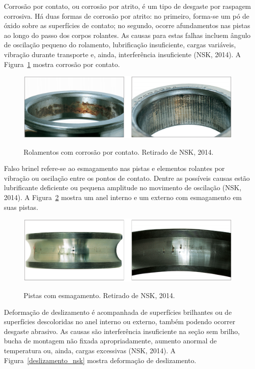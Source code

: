 \documentclass[
	12pt,				
	oneside,			
	a4paper,			
	english,			
	brazil,			
	]{abntex2ppgsi}
\begin{document}
Corrosão por contato, ou corrosão por atrito, é um tipo de desgaste por raspagem corrosiva. Há duas formas de corrosão por atrito: no primeiro, forma-se um pó de óxido sobre as superfícies de contato; no segundo, ocorre afundamentos nas pistas ao longo do passo dos corpos rolantes. As causas para estas falhas incluem ângulo de oscilação pequeno do rolamento, lubrificação insuficiente, cargas variáveis, vibração durante transporte e, ainda, interferência insuficiente (NSK, 2014). A Figura~\ref{corrosao_nsk} mostra corrosão por contato.

\begin{figure}[H]
\centering
\caption {Rolamentos com corrosão por contato. Retirado de NSK, 2014.}
\includegraphics[width=\textwidth,height=\textheight,keepaspectratio]{corrosao_nsk}
\label{corrosao_nsk}
\end{figure}

Falso brinel refere-se ao esmagamento nas pistas e elementos rolantes por vibração ou oscilação entre os pontos de contato. Dentre as possíveis causas estão lubrificante deficiente ou pequena amplitude no movimento de oscilação (NSK, 2014). A Figura~\ref{esmagamento_nsk} mostra um anel interno e um externo com esmagamento em suas pistas.

\begin{figure}[H]
\centering
\caption {Pistas com esmagamento. Retirado de NSK, 2014.}
\includegraphics[width=\textwidth,height=\textheight,keepaspectratio]{esmagamento_nsk}
\label{esmagamento_nsk}
\end{figure}

Deformação de deslizamento é acompanhada de superfícies brilhantes ou de superfícies descoloridas no anel interno ou externo, também podendo ocorrer desgaste abrasivo. As causas são interferência insuficiente na seção sem brilho, bucha de montagem não fixada apropriadamente, aumento anormal de temperatura ou, ainda, cargas excessivas (NSK, 2014). A Figura~\ref{deslizamento_nsk} mostra deformação de deslizamento.
\end{document}
